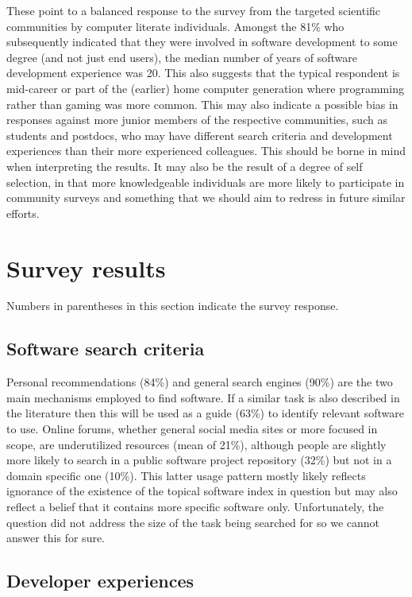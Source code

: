 \documentclass{casicswhitepaper}
\begin{document}
These point to a balanced response to the survey from the targeted scientific communities by computer literate individuals. Amongst the 81\% who subsequently indicated that they were involved in software development to some degree (and not just end users), the median number of years of software development experience was 20. This also suggests that the typical respondent is mid-career or part of the (earlier) home computer generation where programming rather than gaming was more common. This may also indicate a possible bias in responses against more junior members of the respective communities, such as students and postdocs, who may have different search criteria and development experiences than their more experienced colleagues. This should be borne in mind when interpreting the results. It may also be the result of a degree of self selection, in that 
more knowledgeable individuals are more likely to participate in community surveys and something that we should aim to redress in future similar efforts.

\section{Survey results}

Numbers in parentheses in this section indicate the survey response.

\subsection{Software search criteria}

Personal recommendations (84\%) and general search engines (90\%) are the two main mechanisms employed to find software. If a similar task is also described in the literature then this will be used as a guide (63\%) to identify relevant software to use. Online forums, whether general social media sites or more focused in scope, are underutilized resources (mean of 21\%), although people are slightly more likely to search in a public software project repository (32\%) but not in a domain specific one (10\%). This latter usage pattern mostly likely reflects ignorance of the existence of the topical software index in question but may also reflect a belief that it contains more specific software only. Unfortunately, the question did not address the size of the task being searched for so we cannot answer this for sure.





\subsection{Developer experiences}
\end{document}
